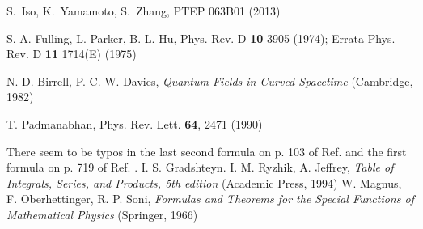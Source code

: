 \documentclass[aps,prd,preprintnumbers,nofootinbib,showpacs,11pt]{revtex4}%
\begin{document}
\begin{widetext}
\begin{thebibliography}{99}
S.~Iso, K.~Yamamoto, S.~Zhang, PTEP 063B01 (2013)

S. A. Fulling, L. Parker, B. L. Hu, Phys. Rev. D {\bf 10} 3905 (1974); Errata Phys. Rev. D {\bf 11} 1714(E) (1975)

N. D. Birrell, P. C. W. Davies, {\it Quantum Fields in Curved Spacetime} (Cambridge, 1982)

T. Padmanabhan, Phys. Rev. Lett. {\bf 64}, 2471 (1990)

There seem to be typos in the last second formula on p. 103 of Ref. \cite{Magnus} and the first formula 
on p. 719 of Ref. \cite{Tables}. 
I. S. Gradshteyn. I. M. Ryzhik, A. Jeffrey, {\it Table of Integrals, Series, and Products, 5th edition} (Academic Press, 1994)
W. Magnus, F. Oberhettinger, R. P. Soni, {\it Formulas and Theorems for the Special Functions of Mathematical Physics} (Springer, 1966)


\end{thebibliography}


\end{widetext}
\end{document}
